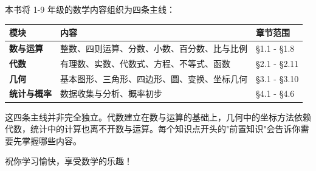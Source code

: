 本书将 1-9 年级的数学内容组织为四条主线：

\begin{center}
\begin{tabular}{lll}
\toprule
模块 & 内容 & 章节范围 \\
\midrule
\textbf{数与运算} & 整数、四则运算、分数、小数、百分数、比与比例 & §1.1 - §1.8 \\
\textbf{代数} & 有理数、实数、代数式、方程、不等式、函数 & §2.1 - §2.11 \\
\textbf{几何} & 基本图形、三角形、四边形、圆、变换、坐标几何 & §3.1 - §3.10 \\
\textbf{统计与概率} & 数据收集与分析、概率初步 & §4.1 - §4.6 \\
\bottomrule
\end{tabular}
\end{center}


这四条主线并非完全独立。代数建立在数与运算的基础上，几何中的坐标方法依赖代数，统计中的计算也离不开数与运算。每个知识点开头的"前置知识"会告诉你需要先掌握哪些内容。

祝你学习愉快，享受数学的乐趣！
